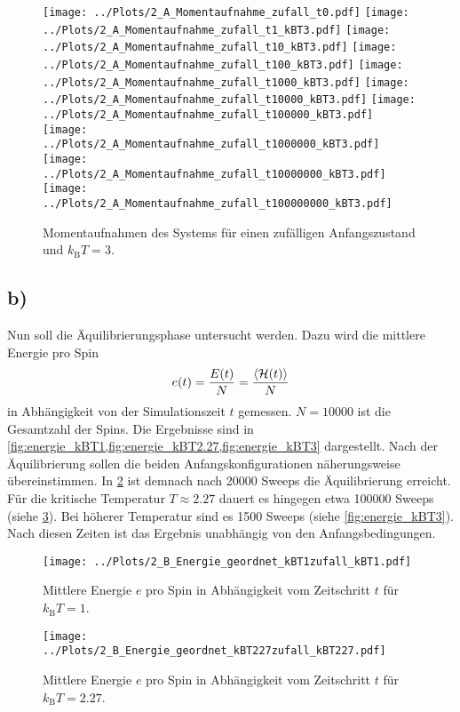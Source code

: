 \begin{figure}
\centering
\texttt{[image: ../Plots/2\_A\_Momentaufnahme\_zufall\_t0.pdf]}
\texttt{[image: ../Plots/2\_A\_Momentaufnahme\_zufall\_t1\_kBT3.pdf]}
\texttt{[image: ../Plots/2\_A\_Momentaufnahme\_zufall\_t10\_kBT3.pdf]}
\texttt{[image: ../Plots/2\_A\_Momentaufnahme\_zufall\_t100\_kBT3.pdf]}
\texttt{[image: ../Plots/2\_A\_Momentaufnahme\_zufall\_t1000\_kBT3.pdf]}
\texttt{[image: ../Plots/2\_A\_Momentaufnahme\_zufall\_t10000\_kBT3.pdf]}
\texttt{[image: ../Plots/2\_A\_Momentaufnahme\_zufall\_t100000\_kBT3.pdf]}
\texttt{[image: ../Plots/2\_A\_Momentaufnahme\_zufall\_t1000000\_kBT3.pdf]}
\texttt{[image: ../Plots/2\_A\_Momentaufnahme\_zufall\_t10000000\_kBT3.pdf]}
\texttt{[image: ../Plots/2\_A\_Momentaufnahme\_zufall\_t100000000\_kBT3.pdf]}
\caption{Momentaufnahmen des Systems für einen zufälligen Anfangszustand und $k_\text{B}T=3$.}
\label{fig:moment_zufall_kBT3}
\end{figure}

\subsection*{b)}
Nun soll die Äquilibrierungsphase untersucht werden.
Dazu wird die mittlere Energie pro Spin \[e(t)=\frac{E(t)}{N}=\frac{\braket{\mathcal{H}(t)}}{N}\]
in Abhängigkeit von der Simulationszeit $t$ gemessen.
$N=\num{10000}$ ist die Gesamtzahl der Spins.
Die Ergebnisse sind in \cref{fig:energie_kBT1,fig:energie_kBT2.27,fig:energie_kBT3} dargestellt.
Nach der Äquilibrierung sollen die beiden Anfangskonfigurationen näherungsweise übereinstimmen.
In \cref{fig:energie_kBT1} ist demnach nach \num{20000} Sweeps die Äquilibrierung erreicht.
Für die kritische Temperatur $T\approx\num{2.27}$ dauert es hingegen etwa \num{100000} Sweeps (siehe \cref{fig:energie_kBT2.27}).
Bei höherer Temperatur sind es \num{1500} Sweeps (siehe \cref{fig:energie_kBT3}).
Nach diesen Zeiten ist das Ergebnis unabhängig von den Anfangsbedingungen.

\begin{figure}[H]
\centering
\texttt{[image: ../Plots/2\_B\_Energie\_geordnet\_kBT1zufall\_kBT1.pdf]}
\caption{Mittlere Energie $e$ pro Spin in Abhängigkeit vom Zeitschritt $t$ für $k_\text{B}T=1$.}
\label{fig:energie_kBT1}
\end{figure}

\begin{figure}[H]
\centering
\texttt{[image: ../Plots/2\_B\_Energie\_geordnet\_kBT227zufall\_kBT227.pdf]}
\caption{Mittlere Energie $e$ pro Spin in Abhängigkeit vom Zeitschritt $t$ für $k_\text{B}T=\num{2,27}$.}
\label{fig:energie_kBT2.27}
\end{figure}

